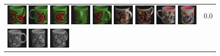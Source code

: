 \begin{figure}[!bp]
\begin{tabular}{m{11cm} | m{3cm} |}
\includegraphics[width=1cm]{coil/beeld-33.eps}
\includegraphics[width=1cm]{coil/beeld-31.eps}
\includegraphics[width=1cm]{coil/beeld-32.eps}
\includegraphics[width=1cm]{coil/beeld-35.eps}
\includegraphics[width=1cm]{coil/beeld-34.eps}
\includegraphics[width=1cm]{coil/beeld-64.eps}
\includegraphics[width=1cm]{coil/beeld-63.eps}
\includegraphics[width=1cm]{coil/beeld-7.eps}
\includegraphics[width=1cm]{coil/beeld-8.eps}
& {\scriptsize 0.0}
\\
\includegraphics[width=1cm]{coil/beeld-48.eps}
\includegraphics[width=1cm]{coil/beeld-50.eps}
\includegraphics[width=1cm]{coil/beeld-51.eps}

\end{tabular}
\end{figure}

